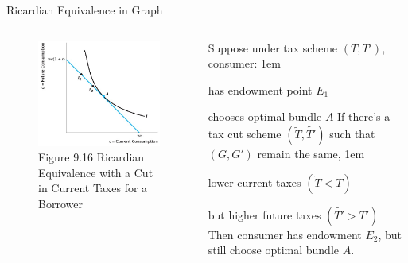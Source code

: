 \documentclass[11pt,aspectratio=43,usenames,dvipsnames]{beamer}
\let\olditemize=\itemize
\let\endolditemize=\enditemize
\renewenvironment{itemize}{\olditemize \itemsep1em}{\endolditemize}
\theoremstyle{definition}
\begin{document}
\begin{frame}{Ricardian Equivalence in Graph}
\label{slide:Ricardian_Equivalence_in_Graph}
    \begin{columns}
        \begin{column}{0.5\textwidth}
            \begin{figure}
                \caption{\scriptsize Figure 9.16  Ricardian Equivalence with a Cut in Current Taxes for a Borrower}
                \includegraphics[width=\textwidth]{./figures/Figure9_16.jpg}
            \end{figure}


        \end{column}
        \begin{column}{0.5\textwidth}
            Suppose under tax scheme $ ( T, T' ) $, consumer:
            \begin{itemize}
                \item has endowment point $ E_{1} $
                \item chooses optimal bundle $ A $
            \end{itemize}
            If there's a tax cut scheme $ ( \tilde{T}, \tilde{T'} ) $ such that $ ( G, G' ) $ remain the same,
            \begin{itemize}
                \item lower current taxes $ ( \tilde{T} < T ) $
                \item but higher future taxes $ ( \tilde{T'} > T' ) $
            \end{itemize}
            Then consumer has endowment $ E_{2} $, but still choose optimal bundle $ A $.
        \end{column}
    \end{columns}
\end{frame}
\end{document}
